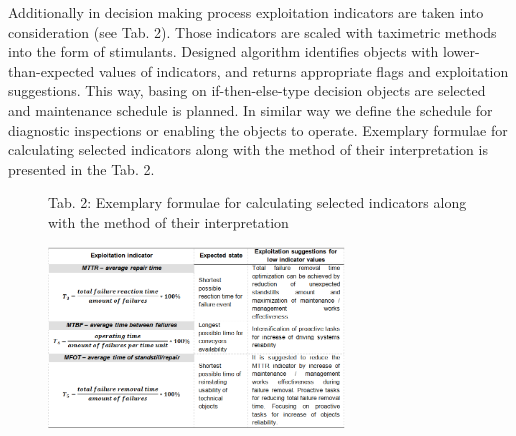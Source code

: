 Additionally in decision making process exploitation indicators are taken into consideration (see Tab. 2). Those indicators are scaled with taximetric methods into the form of stimulants. Designed algorithm identifies objects with lower-than-expected values of indicators, and returns appropriate flags and exploitation suggestions. This way, basing on if-then-else-type decision objects are selected and maintenance schedule is planned. In similar way we define the schedule for diagnostic inspections or enabling the objects to operate. Exemplary formulae for calculating selected indicators along with the method of their interpretation is presented in the Tab. 2. \par

\begin{figure}[ht!]
\begin{flushleft}{\normalsize Tab. 2: Exemplary formulae for calculating selected indicators along with the method of their interpretation}\end{flushleft}
\centering
\includegraphics[width =0.7\textwidth]{Wykresy/tab.PNG}
\label{fig: f7}
\end{figure}



